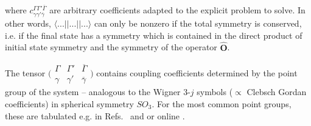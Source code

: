 \documentclass[twocolumn,prb,twocolumn,amsmath,superscriptaddress,nofootinbib,amssymb]{revtex4-1}
\newcommand{\vect}[1]{\boldsymbol{#1}}
\begin{document}
\begin{widetext}
\noindent where $c^{\Gamma\Gamma'\overline{\Gamma}}_{\gamma\gamma'\overline{\gamma}}$ are arbitrary coefficients adapted to the explicit problem to solve. In other words, $\langle ... ||...||... \rangle$ can only be nonzero if the total symmetry is conserved, i.e. if the final state has a symmetry which is contained in the direct product of initial state symmetry and the symmetry of the operator $\hat{\vect{O}}$.

The tensor $\bigl( \begin{smallmatrix}
  \Gamma & \Gamma' &\overline{\Gamma}\\
  \gamma & \gamma' &\overline{\gamma}
\end{smallmatrix} \bigr)$ contains coupling coefficients determined by the point group of the system -- analogous to the Wigner $3$-$j$ symbols ($\propto$ Clebsch Gordan coefficients) in spherical symmetry $SO_3$. For the most common point groups, these are tabulated e.g. in Refs.~ and  or online \cite{Snoke}.


\end{widetext}
\end{document}
